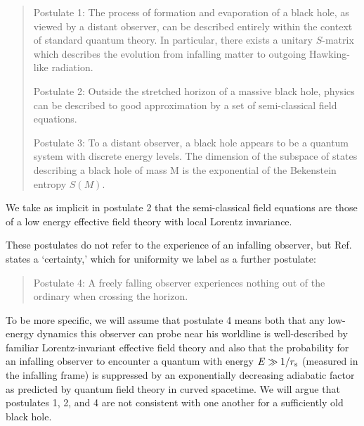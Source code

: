 \documentclass[12pt]{article}
\begin{document}
\begin{quote}

{Postulate 1:} {The process of formation and evaporation of a black hole, as viewed by a distant observer, can be described entirely within the context of standard quantum theory. In particular, there exists a unitary $S$-matrix which describes the evolution from infalling matter to outgoing Hawking-like radiation.}

{Postulate 2:} {Outside the stretched horizon of a massive black hole, physics can be described to good approximation by a set of semi-classical field equations.}

{Postulate 3:} To a distant observer, a black hole appears to be a quantum system with discrete energy levels. The dimension of the subspace of states describing a black hole of mass M is the exponential of the Bekenstein entropy $S(M)$.

\end{quote}
{We take as implicit in postulate 2 that the semi-classical field equations are those of a low energy effective field theory with local Lorentz invariance.}

These postulates do not refer to the experience of an infalling observer, but Ref.~\cite{Susskind:1993if} states a `certainty,' which for uniformity we label as a further postulate:

\begin{quote}

{Postulate 4:} A freely falling observer experiences nothing out of the ordinary when crossing the horizon.
\end{quote}
To be more specific, we will assume that postulate 4 means {both that any low-energy dynamics this observer can probe near his worldline is well-described by familiar Lorentz-invariant effective field theory and also} that the probability for an infalling observer to encounter a quantum with energy $E \gg 1/r_{\rm s}$ (measured in the infalling frame) is suppressed by
an exponentially decreasing adiabatic factor as predicted by quantum field theory in curved spacetime.     We will argue that postulates 1, 2, and 4 are not consistent with one another for a sufficiently old black hole.
\end{document}
